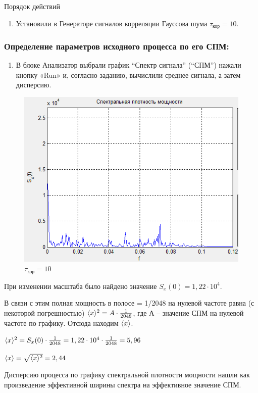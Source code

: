 Порядок действий
\begin{enumerate}
	\item Установили в Генераторе сигналов корреляции Гауссова шума $\tau_\text{кор}=10$.
\end{enumerate}
\subsubsection[Задание 5.1]{Определение параметров исходного процесса по его СПМ:}
\begin{enumerate}
	\item В блоке Анализатор выбрали график “Спектр сигнала” (“СПМ”) нажали кнопку «Run» и, согласно заданию, вычислили среднее сигнала, а затем дисперсию.
\end{enumerate}

\begin{figure}[H]
	\centering
    \includegraphics[width=0.8\linewidth]{fig/fig51}
	\caption*{$\tau_\text{кор} = 10$}
\end{figure}	


При изменении масштаба было найдено значение $S_x(0)=1,22\cdot 10^4$.

В связи с этим полная мощность в полосе  = 1/2048 на нулевой частоте равна (с некоторой погрешностью) $\langle x\rangle^2 = A\cdot \frac{1}{2048}$, где $А$ – значение СПМ на нулевой частоте по графику. Отсюда находим $\langle x\rangle$.

$\langle x\rangle^2 = S_x(0)\cdot \frac{1}{2048}= 1,22\cdot 10^4\cdot \frac{1}{2048} = 5,96$

$\langle x\rangle =  \sqrt{\langle x\rangle^2} = 2,44$

Дисперсию процесса по графику спектральной плотности мощности нашли как произведение эффективной ширины спектра на эффективное значение СПМ.

